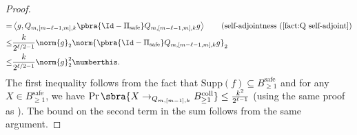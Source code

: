 \begin{proof}
\begin{align*}
        =&\left\langle g,Q_{m,[m-\ell-1,m],k}\pbra{\Id-\Pi_{\mathrm{safe}}}Q_{m,[m-\ell-1,m],k}g\right\rangle\tag{self-adjointness (\Cref{fact:Q self-adjoint}}\\
        \leq &\frac{k}{2^{\ell/2-1}}\norm{g}_2\norm{\pbra{\Id-\Pi_{\mathrm{safe}}}Q_{m,[m-\ell-1,m],k}g}_2\\
        \leq&\frac{k}{2^{\ell/2-1}}\norm{g}_2^2\numberthis\label{eq:safe to not safe Q}.
    \end{align*}
    The first inequality follows from  the fact that $\mathrm{Supp}(f)\subseteq B_{\geq1}^{\mathrm{safe}}$ and for any $X\in B_{\geq1}^{\mathrm{safe}}$, we have $\Pr\sbra{X\to_{Q_{m,[m-1],k}}B_{\geq1}^{\mathrm{coll}}}\leq \frac{k^2}{2^{\ell-1}}$ (using the same proof as ). The bound on the second term in the sum  follows from the same argument.
\end{proof}




